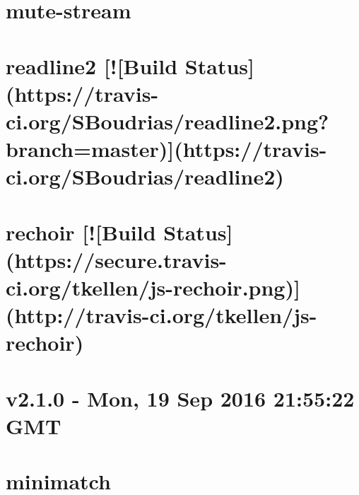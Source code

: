 \documentclass[twoside]{book}
\newcommand{\+}{\discretionary{\mbox{\scriptsize$\hookleftarrow$}}{}{}}
\begin{document}
\chapter{mute-\/stream}
\label{md__c_1_workspace_demo_src_main_script_node_modules_readline2_node_modules_mute-stream__r_e_a_d_m_e}

\chapter{readline2 \mbox{[}!\mbox{[}Build Status\mbox{]}(https\+://travis-\/ci.org/\+S\+Boudrias/readline2.png?branch=master)\mbox{]}(https\+://travis-\/ci.org/\+S\+Boudrias/readline2)}
\label{md__c_1_workspace_demo_src_main_script_node_modules_readline2__r_e_a_d_m_e}

\chapter{rechoir \mbox{[}!\mbox{[}Build Status\mbox{]}(https\+://secure.travis-\/ci.org/tkellen/js-\/rechoir.png)\mbox{]}(http\+://travis-\/ci.org/tkellen/js-\/rechoir)}
\label{md__c_1_workspace_demo_src_main_script_node_modules_rechoir__r_e_a_d_m_e}

\chapter{v2.1.0 -\/ Mon, 19 Sep 2016 21\+:55\+:22 G\+MT}
\label{md__c_1_workspace_demo_src_main_script_node_modules_recursive-readdir__c_h_a_n_g_e_l_o_g}

\chapter{minimatch}
\label{md__c_1_workspace_demo_src_main_script_node_modules_recursive-readdir_node_modules_minimatch__r_e_a_d_m_e}

\end{document}
